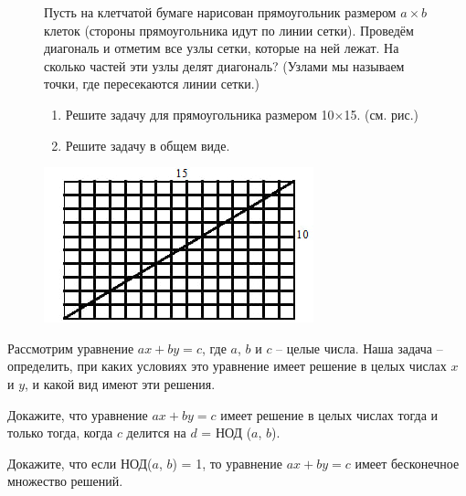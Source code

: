 \begin{figure}[H]
\begin{minipage}{0.6\linewidth}
    Пусть на клетчатой бумаге нарисован прямоугольник размером $a \times b$ клеток (стороны прямоугольника идут по линии сетки). Проведём диагональ и отметим все узлы сетки, которые на ней лежат. На сколько частей эти узлы делят диагональ? (Узлами мы называем точки, где пересекаются линии сетки.)
    \begin{enumerate}[noitemsep, label=\asbuk*), ref=\asbuk*]
    \item  Решите задачу для прямоугольника размером 10$\times$15. (см. рис.)
    \item  Решите задачу в общем виде.
    \end{enumerate}
    \end{minipage}
    \hfill
\begin{minipage}{0.39\linewidth}
    \includegraphics[width=0.95\columnwidth]{img/11.2 img1.jpg}
\end{minipage}
\end{figure}

Рассмотрим уравнение $ax + by = c$, где $a$, $b$ и $c$ -- целые числа. Наша задача -- определить, при каких условиях это уравнение имеет решение в целых числах $x$ и $y$, и какой вид имеют эти решения.

\begin{thm}
    Докажите, что уравнение $ax + by = c$ имеет решение в целых числах тогда и только тогда, когда $c$ делится на $d$ = НОД ($a$, $b$).
\end{thm}

\begin{thm}
    Докажите, что если НОД($a$, $b$) = 1, то уравнение $ax + by = c$ имеет бесконечное множество решений.
\end{thm}

